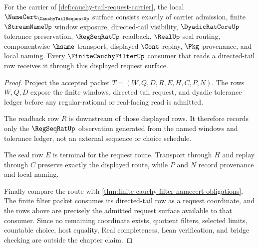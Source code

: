 \begin{theorem}
\label{thm:cauchy-tail-request-namecert-obligations}
For the carrier of \autoref{def:cauchy-tail-request-carrier}, the local $\NameCert_{\CauchyTailRequestUp}$ surface consists exactly of carrier admission, finite $\StreamNameUp$ window exposure, directed-tail visibility, $\DyadicRatCoreUp$ tolerance preservation, $\RegSeqRatUp$ readback, $\RealUp$ seal routing, componentwise $\hsame$ transport, displayed $\Cont$ replay, $\Pkg$ provenance, and local naming. Every $\FiniteCauchyFilterUp$ consumer that reads a directed-tail row receives it through this displayed request surface.
\end{theorem}
\begin{proof}
Project the accepted packet $T=(W,Q,D,R,E,H,C,P,N)$. The rows $W,Q,D$ expose the finite windows, directed tail request, and dyadic tolerance ledger before any regular-rational or real-facing read is admitted.

The readback row $R$ is downstream of those displayed rows. It therefore records only the $\RegSeqRatUp$ observation generated from the named windows and tolerance ledger, not an external sequence or choice schedule.

The seal row $E$ is terminal for the request route. Transport through $H$ and replay through $C$ preserve exactly the displayed route, while $P$ and $N$ record provenance and local naming.

Finally compare the route with \autoref{thm:finite-cauchy-filter-namecert-obligations}. The finite filter packet consumes its directed-tail row as a request coordinate, and the rows above are precisely the admitted request surface available to that consumer. Since no remaining coordinate exists, quotient filters, selected limits, countable choice, host equality, Real completeness, Lean verification, and bridge checking are outside the chapter claim.
\end{proof}


\begin{closurestatus}{\CauchyTailRequestUp}
  \theoryclosure{\seedClosure}
  \formalstatus{\unformalizedV}
\end{closurestatus}
